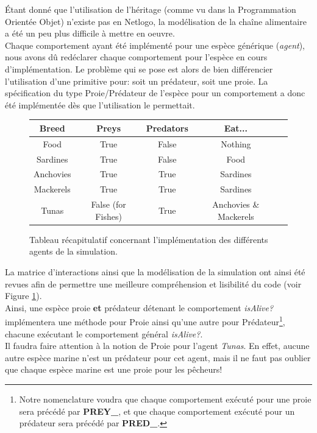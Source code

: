 Étant donné que l'utilisation de l'héritage (comme vu dans la Programmation Orientée Objet) n'existe pas en Netlogo, la modélisation de la chaîne alimentaire a été un peu plus difficile à mettre en oeuvre.
\\
Chaque comportement ayant été implémenté pour une espèce générique (\textit{agent}), nous avons dû redéclarer chaque comportement pour l'espèce en cours d'implémentation. Le problème qui se pose est alors de bien différencier l'utilisation d'une primitive pour: soit un prédateur, soit une proie. La spécification du type Proie/Prédateur de l'espèce pour un comportement a donc été implémentée dès que l'utilisation le permettait.

\begin{figure}[h]
\begin{center}
\begin{tabular}{|c|c|c|c|c|}
  \hline
  \textbf{Breed} & \textbf{Preys} & \textbf{Predators} & \textbf{Eat...}\\
  \hline
  Food & True & False & Nothing \\
  Sardines & True & False & Food \\
  Anchovies & True & True & Sardines \\
  Mackerels & True & True & Sardines \\
  Tunas & False (for Fishes) & True & Anchovies \& Mackerels \\
  \hline
\end{tabular}
\end{center}

\caption{Tableau récapitulatif concernant l'implémentation des différents agents de la simulation.}
\label{fig:recap_agents}
\end{figure}

La matrice d'interactions ainsi que la modélisation de la simulation ont ainsi été revues afin de permettre une meilleure compréhension et lisibilité du code (voir Figure \ref{fig:recap_agents}).
\\
Ainsi, une espèce proie \textbf{et} prédateur détenant le comportement \textit{isAlive?} implémentera une méthode pour Proie ainsi qu'une autre pour Prédateur\footnote{Notre nomenclature voudra que chaque comportement exécuté pour une proie sera précédé par \textbf{PREY\_}, et que chaque comportement exécuté pour un prédateur sera précédé par \textbf{PRED\_}.}, chacune exécutant le comportement général \textit{isAlive?}.
\\
Il faudra faire attention à la notion de Proie pour l'agent \textit{Tunas}. En effet, aucune autre espèce marine n'est un prédateur pour cet agent, mais il ne faut pas oublier que chaque espèce marine est une proie pour les pêcheurs!

